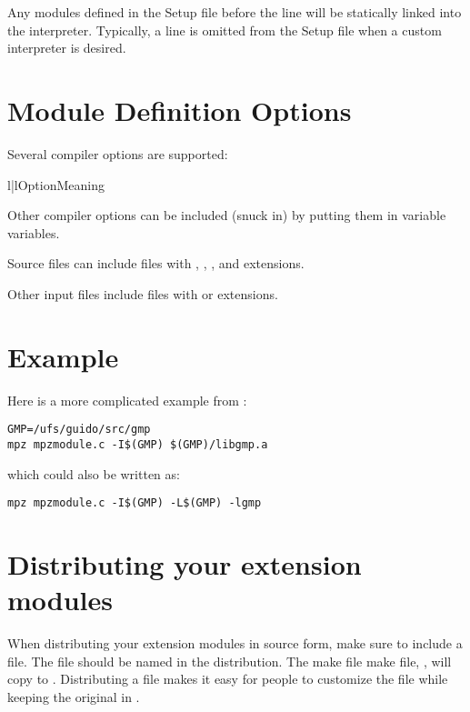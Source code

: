 \documentclass{manual}
\begin{document}
Any modules defined in the Setup file before the  line
will be statically linked into the interpreter.  Typically, a
 line is omitted from the Setup file when a custom
interpreter is desired.

\section{Module Definition Options}

Several compiler options are supported:

\begin{tableii}{l|l}{}{Option}{Meaning}
\end{tableii}

Other compiler options can be included (snuck in) by putting them
in variable variables.

Source files can include files with , , ,
and  extensions. 

Other input files include files with  or 
extensions.


\section{Example}

Here is a more complicated example from :

\begin{verbatim}
GMP=/ufs/guido/src/gmp
mpz mpzmodule.c -I$(GMP) $(GMP)/libgmp.a
\end{verbatim}

which could also be written as:

\begin{verbatim}
mpz mpzmodule.c -I$(GMP) -L$(GMP) -lgmp
\end{verbatim}


\section{Distributing your extension modules
         \label{distributing}}

When distributing your extension modules in source form, make sure to
include a  file.  The  file should be named
 in the distribution.  The make file make file,
, will copy  to .
Distributing a  file makes it easy for people to
customize the  file while keeping the original in
.
\end{document}

